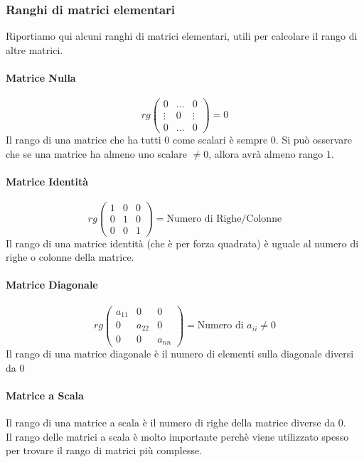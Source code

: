 \subsubsection*{Ranghi di matrici elementari}
Riportiamo qui alcuni ranghi di matrici elementari, utili per calcolare il rango di altre matrici.
\paragraph{Matrice Nulla}
\[ rg
	\begin{pmatrix}
		0      & ... & 0      \\
		\vdots & 0   & \vdots \\
		0      & ... & 0
	\end{pmatrix}
	= 0
\]
Il rango di una matrice che ha tutti $0$ come scalari è sempre $0$.
Si può osservare che se una matrice ha almeno uno scalare $\neq 0$, allora avrà almeno rango $1$.

\paragraph{Matrice Identità}
\[ rg
	\begin{pmatrix}
		1 & 0 & 0 \\
		0 & 1 & 0 \\
		0 & 0 & 1
	\end{pmatrix}
	= \text{Numero di Righe/Colonne}
\]
Il rango di una matrice identità (che è per forza quadrata) è uguale al numero di righe o colonne della matrice.

\paragraph{Matrice Diagonale}
\[ rg
	\begin{pmatrix}
		a_{11} & 0      & 0      \\
		0      & a_{22} & 0      \\
		0      & 0      & a_{nn}
	\end{pmatrix}
	= \text{Numero di } a_{ii}\neq 0
\]
Il rango di una matrice diagonale è il numero di elementi sulla diagonale diversi da 0

\paragraph{Matrice a Scala}
Il rango di una matrice a scala è il numero di righe della matrice diverse da 0.
\\Il rango delle matrici a scala è molto importante perchè viene utilizzato spesso per trovare il rango di matrici più complesse.

